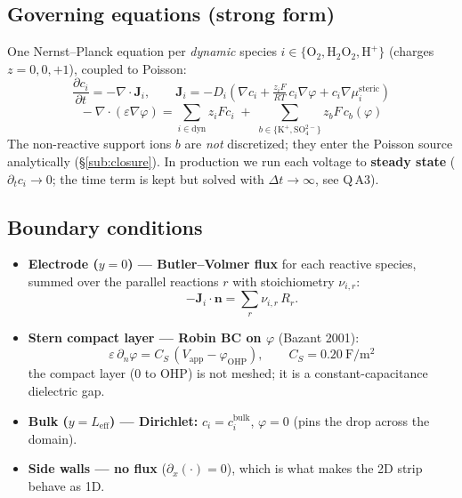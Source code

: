 \documentclass[11pt]{article}
\newcommand{\CS}{C_{S}}
\newcommand{\Jbf}{\mathbf{J}}
\newcommand{\nbf}{\mathbf{n}}
\newcommand{\Leff}{L_{\mathrm{eff}}}
\newcommand{\dyn}{\mathrm{dyn}}
\newcommand{\bulk}{\mathrm{bulk}}
\begin{document}
\subsection{Governing equations (strong form)}
One Nernst--Planck equation per \emph{dynamic} species $i\in\{\mathrm{O_2},
\mathrm{H_2O_2},\mathrm{H^+}\}$ (charges $z=0,0,+1$), coupled to Poisson:
\[
  \boxed{\;\frac{\partial c_i}{\partial t}
   = -\nabla\!\cdot\Jbf_i,\qquad
   \Jbf_i = -D_i\!\left(\nabla c_i + \tfrac{z_i F}{RT}\,c_i\nabla\varphi
            + c_i\nabla\mu_i^{\mathrm{steric}}\right)\;}
\]
\[
  \boxed{\;-\nabla\!\cdot(\varepsilon\nabla\varphi)
   = \sum_{i\in\dyn} z_i F c_i \;+\; \sum_{b\in\{\mathrm{K^+,SO_4^{2-}}\}}
     z_b F\,c_b(\varphi)\;}
\]
The non-reactive support ions $b$ are \emph{not} discretized; they enter
the Poisson source analytically (\S\ref{sub:closure}). In production we run
each voltage to \textbf{steady state} ($\partial_t c_i\to0$; the time term
is kept but solved with $\Delta t\to\infty$, see Q\,A3).

\subsection{Boundary conditions}
\begin{itemize}
\item \textbf{Electrode ($y=0$) --- Butler--Volmer flux} for each reactive
species, summed over the parallel reactions $r$ with stoichiometry
$\nu_{i,r}$:
\[
  -\Jbf_i\!\cdot\nbf = \sum_r \nu_{i,r}\,R_r .
\]
\item \textbf{Stern compact layer --- Robin BC on $\varphi$} (Bazant 2001):
\[
  \boxed{\;\varepsilon\,\partial_n\varphi = \CS\,(V_{\mathrm{app}}
   - \varphi_{\mathrm{OHP}}),\qquad \CS = 0.20~\mathrm{F/m^2}\;}
\]
the compact layer (0 to OHP) is not meshed; it is a constant-capacitance
dielectric gap.
\item \textbf{Bulk ($y=\Leff$) --- Dirichlet:} $c_i=c_i^{\bulk}$,
$\varphi=0$ (pins the drop across the domain).
\item \textbf{Side walls --- no flux} ($\partial_x(\cdot)=0$), which is what
makes the 2D strip behave as 1D.
\end{itemize}
\end{document}
